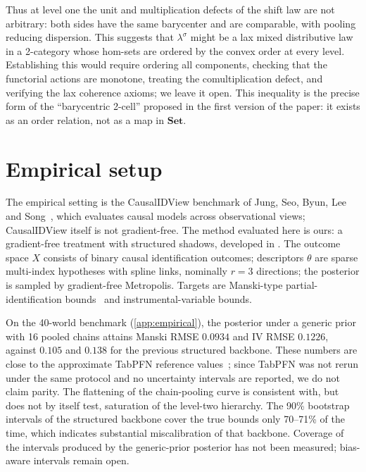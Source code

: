 \documentclass[11pt]{article}
\theoremstyle{definition}
\theoremstyle{remark}
\newcommand{\Set}{\mathbf{Set}}
\newcommand{\ls}{\lambda^{\sigma}}
\begin{document}
Thus at level one the unit and multiplication defects of the shift law are not arbitrary: both sides
have the same barycenter and are comparable, with pooling reducing dispersion. This suggests that
$\ls$ might be a lax mixed distributive law in a 2-category whose hom-sets are ordered by the convex
order at every level. Establishing this would require ordering all components, checking that the
functorial actions are monotone, treating the comultiplication defect, and verifying the lax
coherence axioms; we leave it open. This inequality is the precise form of the ``barycentric 2-cell''
proposed in the first version of the paper: it exists as an order relation, not as a map in $\Set$.

\section{Empirical setup}

The empirical setting is the CausalIDView benchmark of Jung, Seo, Byun, Lee and
Song~\cite{Jung2026}, which evaluates causal models across observational views; CausalIDView itself
is not gradient-free. The method evaluated here is ours: a gradient-free treatment with structured
shadows, developed in \cite[Section~51]{Awasthi-ThreeLayers}. The outcome space $X$ consists of binary causal
identification outcomes; descriptors $\theta$ are sparse multi-index hypotheses with spline links,
nominally $r=3$ directions; the posterior is sampled by gradient-free Metropolis. Targets are
Manski-type partial-identification bounds~\cite{Manski1990} and instrumental-variable bounds.

On the 40-world benchmark (\cref{app:empirical}), the posterior under a generic prior with 16 pooled
chains attains Manski RMSE $0.0934$ and IV RMSE $0.1226$, against $0.105$ and $0.138$ for the
previous structured backbone. These numbers are close to the approximate TabPFN reference
values~\cite{Hollmann2023}; since TabPFN was not rerun under the same protocol and no uncertainty
intervals are reported, we do not claim parity. The flattening of the chain-pooling curve is
consistent with, but does not by itself test, saturation of the level-two hierarchy. The 90\%
bootstrap intervals of the structured backbone cover the true bounds only 70--71\% of the time, which
indicates substantial miscalibration of that backbone. Coverage of the intervals produced by the
generic-prior posterior has not been measured; bias-aware intervals remain open.
\end{document}
